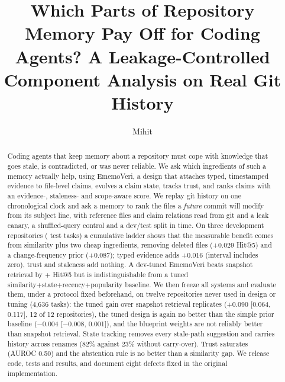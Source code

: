 \documentclass[runningheads]{llncs}
\newcommand{\sys}{EmemoVeri}
\begin{document}
\title{Which Parts of Repository Memory Pay Off for Coding Agents? A Leakage-Controlled Component Analysis on Real Git History}
\author{Mihit}
\maketitle

\begin{abstract}
Coding agents that keep memory about a repository must cope with knowledge that goes stale, is contradicted, or was never reliable. We ask which ingredients of such a memory actually help, using \sys{}, a design that attaches typed, timestamped evidence to file-level claims, evolves a claim state, tracks trust, and ranks claims with an evidence-, staleness- and scope-aware score. We replay git history on one chronological clock and ask a memory to rank the files a \emph{future} commit will modify from its subject line, with reference files and claim relations read from git and a leak canary, a shuffled-query control and a dev/test split in time. On three development repositories (\nTest{} test tasks) a cumulative ladder shows that the measurable benefit comes from similarity plus two cheap ingredients, removing deleted files (+0.029 Hit@5) and a change-frequency prior (+0.087); typed evidence adds +0.016 (interval includes zero), trust and staleness add nothing. A dev-tuned \sys{} beats snapshot retrieval by +\dTunedSnapFive{} Hit@5 but is indistinguishable from a tuned similarity+state+recency+popularity baseline. We then freeze all systems and evaluate them, under a protocol fixed beforehand, on twelve repositories never used in design or tuning (4{,}636 tasks): the tuned gain over snapshot retrieval replicates (+0.090 [0.064, 0.117], 12 of 12 repositories), the tuned design is again no better than the simple prior baseline ($-$0.004 [$-$0.008, 0.001]), and the blueprint weights are not reliably better than snapshot retrieval. State tracking removes every stale-path suggestion and carries history across renames (82\% against 23\% without carry-over). Trust saturates (AUROC 0.50) and the abstention rule is no better than a similarity gap. We release code, tests and results, and document eight defects fixed in the original implementation.
\end{abstract}
\end{document}
